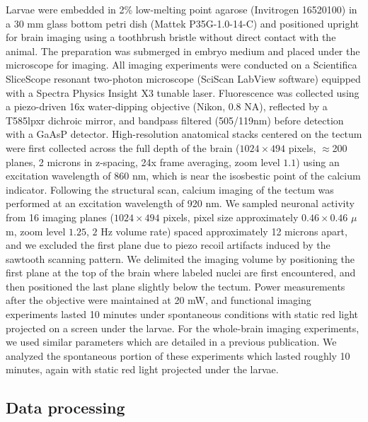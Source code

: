 \documentclass{article}
\begin{document}
Larvae were embedded in 2\% low-melting point agarose (Invitrogen 16520100) in a 30 mm glass bottom petri dish (Mattek P35G-1.0-14-C) and positioned upright for brain imaging using a toothbrush bristle without direct contact with the animal. The preparation was submerged in embryo medium and placed under the microscope for imaging. All imaging experiments were conducted on a Scientifica SliceScope resonant two-photon microscope (SciScan LabView software) equipped with a Spectra Physics Insight X3 tunable laser. Fluorescence was collected using a piezo-driven 16x water-dipping objective (Nikon, 0.8 NA), reflected by a T585lpxr dichroic mirror, and bandpass filtered (505/119nm) before detection with a GaAsP detector. High-resolution anatomical stacks centered on the tectum were first collected across the full depth of the brain ($1024\times494$ pixels, $\approx$200 planes, 2 microns in z-spacing, 24x frame averaging, zoom level $1.1$) using an excitation wavelength of 860 nm, which is near the isosbestic point of the calcium indicator. Following the structural scan, calcium imaging of the tectum was performed at an excitation wavelength of 920 nm. We sampled neuronal activity from 16 imaging planes ($1024\times494$ pixels, pixel size approximately $0.46\times0.46$ $\mu$m, zoom level $1.25$, $2$ Hz volume rate) spaced approximately 12 microns apart, and we excluded the first plane due to piezo recoil artifacts induced by the sawtooth scanning pattern. We delimited the imaging volume by positioning the first plane at the top of the brain where labeled nuclei are first encountered, and then positioned the last plane slightly below the tectum. Power measurements after the objective were maintained at 20 mW, and functional imaging experiments lasted 10 minutes under spontaneous conditions with static red light projected on a screen under the larvae. For the whole-brain imaging experiments, we used similar parameters which are detailed in a previous publication\cite{legare2024structural}. We analyzed the spontaneous portion of these experiments which lasted roughly 10 minutes, again with static red light projected under the larvae.

\subsection*{Data processing}
\end{document}
